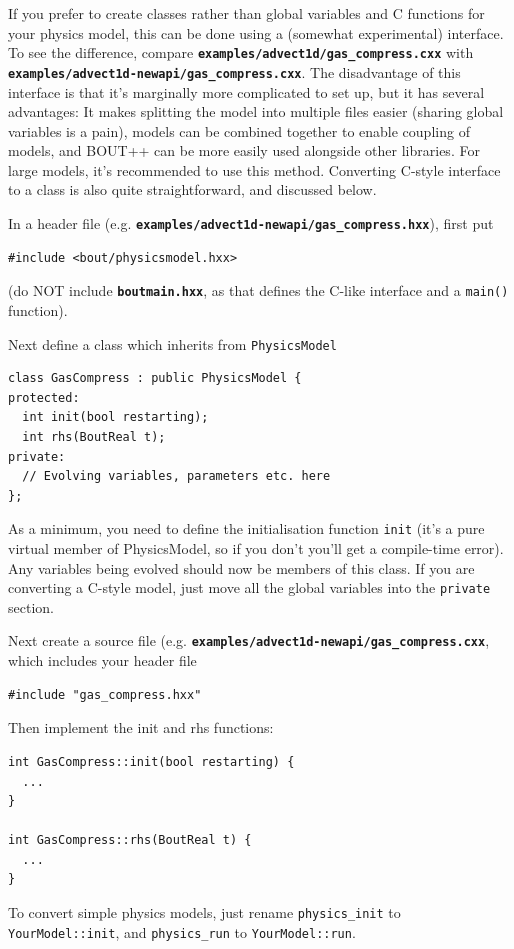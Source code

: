 \documentclass[12pt]{article}
\newcommand{\file}[1]{\texttt{\bf #1}}
\begin{document}
If you prefer to create classes rather than global variables and C functions for your physics model,
this can be done using a (somewhat experimental) interface. To see the difference,
compare \file{examples/advect1d/gas\_compress.cxx} with\\
\file{examples/advect1d-newapi/gas\_compress.cxx}. The disadvantage of this interface 
is that it's marginally more complicated to set up, but it has several advantages: It makes splitting
the model into multiple files easier (sharing global variables is a pain), models can be combined
together to enable coupling of models, and BOUT++ can be more easily used alongside other libraries. 
For large models, it's recommended to use this method. Converting
C-style interface to a class is also quite straightforward, and discussed below.

In a header file (e.g. \file{examples/advect1d-newapi/gas\_compress.hxx}), first put
\begin{lstlisting}
#include <bout/physicsmodel.hxx>
\end{lstlisting}
(do NOT include \file{boutmain.hxx}, as that defines the C-like interface and a \lstinline!main()! function).

Next define a class which inherits from \lstinline!PhysicsModel! 
\begin{lstlisting}
class GasCompress : public PhysicsModel {
protected:
  int init(bool restarting);
  int rhs(BoutReal t);
private:
  // Evolving variables, parameters etc. here
};
\end{lstlisting}
As a minimum, you need to define the initialisation function \lstinline!init! (it's a pure virtual
member of PhysicsModel, so if you don't you'll get a compile-time error). Any variables being evolved
should now be members of this class. If you are converting a C-style model, just move all the global variables into the \lstinline!private! section.

Next create a source file (e.g. \file{examples/advect1d-newapi/gas\_compress.cxx}, which
includes your header file
\begin{lstlisting}
#include "gas_compress.hxx"
\end{lstlisting}

Then implement the init and rhs functions:
\begin{lstlisting}
int GasCompress::init(bool restarting) {
  ...
}

int GasCompress::rhs(BoutReal t) {
  ...
}
\end{lstlisting}
To convert simple physics models, just rename \lstinline!physics_init! to \lstinline!YourModel::init!,
and \lstinline!physics_run! to \lstinline!YourModel::run!. 
\end{document}
